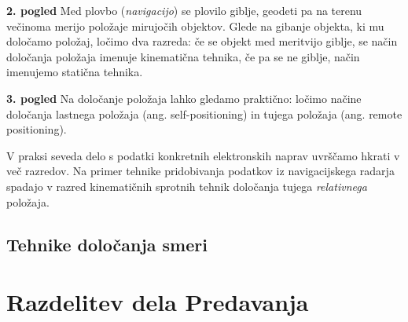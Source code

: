 \textbf{2. pogled} Med plovbo (\textit{navigacijo}) se plovilo giblje, geodeti pa na terenu večinoma merijo položaje mirujočih objektov. Glede na gibanje objekta, ki mu določamo položaj, ločimo dva razreda: če se objekt med meritvijo giblje, se način določanja položaja imenuje kinematična tehnika, če pa se ne giblje, način imenujemo statična tehnika.

\textbf{3. pogled} Na določanje položaja lahko gledamo praktično: ločimo načine določanja lastnega položaja (ang. self-positioning) in tujega položaja (ang. remote positioning).

V praksi seveda delo s podatki konkretnih elektronskih naprav uvrščamo hkrati v več razredov. Na primer tehnike pridobivanja podatkov iz navigacijskega radarja spadajo v razred kinematičnih sprotnih tehnik določanja tujega \textit{relativnega} položaja.

\subsection{Tehnike določanja smeri}
\label{SubSec:TehnDolS}

\section{Razdelitev dela Predavanja}
\label{sec:Uvd_RazdPred}

%
%

